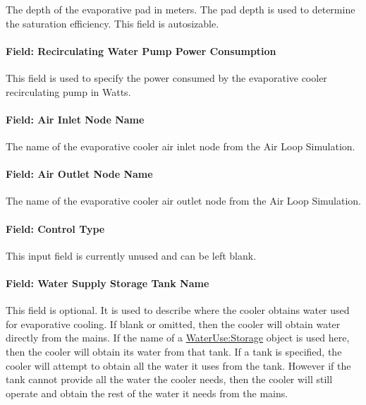 The depth of the evaporative pad in meters. The pad depth is used to determine the saturation efficiency. This field is autosizable.

\paragraph{Field: Recirculating Water Pump Power Consumption}\label{field-recirculating-water-pump-power-consumption}

This field is used to specify the power consumed by the evaporative cooler recirculating pump in Watts.

\paragraph{Field: Air Inlet Node Name}\label{field-air-inlet-node-name-001}

The name of the evaporative cooler air inlet node from the Air Loop Simulation.

\paragraph{Field: Air Outlet Node Name}\label{field-air-outlet-node-name-001}

The name of the evaporative cooler air outlet node from the Air Loop Simulation.

\paragraph{Field: Control Type}\label{field-control-type-001}

This input field is currently unused and can be left blank.

\paragraph{Field: Water Supply Storage Tank Name}\label{field-water-supply-storage-tank-name-000}

This field is optional. It is used to describe where the cooler obtains water used for evaporative cooling. If blank or omitted, then the cooler will obtain water directly from the mains. If the name of a \hyperref[waterusestorage]{WaterUse:Storage} object is used here, then the cooler will obtain its water from that tank. If a tank is specified, the cooler will attempt to obtain all the water it uses from the tank. However if the tank cannot provide all the water the cooler needs, then the cooler will still operate and obtain the rest of the water it needs from the mains.

